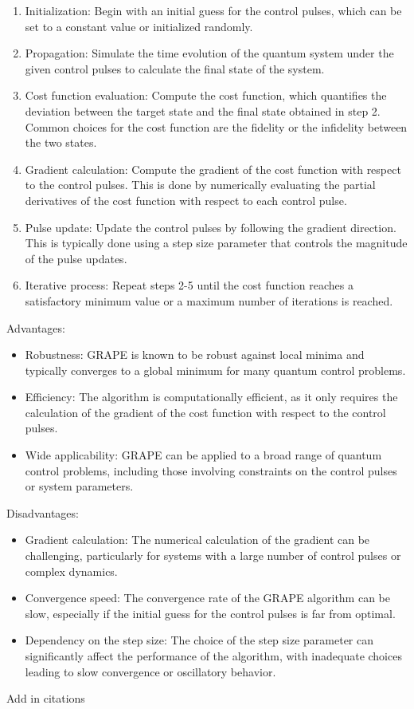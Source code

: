 \begin{enumerate}
    \item Initialization: Begin with an initial guess for the control pulses, which can be set to a constant value or initialized randomly.
    \item Propagation: Simulate the time evolution of the quantum system under the given control pulses to calculate the final state of the system.
    \item Cost function evaluation: Compute the cost function, which quantifies the deviation between the target state and the final state obtained in step 2. Common choices for the cost function are the fidelity or the infidelity between the two states.
    \item Gradient calculation: Compute the gradient of the cost function with respect to the control pulses. This is done by numerically evaluating the partial derivatives of the cost function with respect to each control pulse.
    \item Pulse update: Update the control pulses by following the gradient direction. This is typically done using a step size parameter that controls the magnitude of the pulse updates.
    \item Iterative process: Repeat steps 2-5 until the cost function reaches a satisfactory minimum value or a maximum number of iterations is reached.
\end{enumerate}

Advantages:

\begin{itemize}
    \item Robustness: GRAPE is known to be robust against local minima and typically converges to a global minimum for many quantum control problems.
    \item Efficiency: The algorithm is computationally efficient, as it only requires the calculation of the gradient of the cost function with respect to the control pulses.
    \item Wide applicability: GRAPE can be applied to a broad range of quantum control problems, including those involving constraints on the control pulses or system parameters.
\end{itemize}

Disadvantages:

\begin{itemize}
    \item Gradient calculation: The numerical calculation of the gradient can be challenging, particularly for systems with a large number of control pulses or complex dynamics.
    \item Convergence speed: The convergence rate of the GRAPE algorithm can be slow, especially if the initial guess for the control pulses is far from optimal.
    \item Dependency on the step size: The choice of the step size parameter can significantly affect the performance of the algorithm, with inadequate choices leading to slow convergence or oscillatory behavior.
\end{itemize}

Add in citations \cite{khaneja_optimal_2005}
